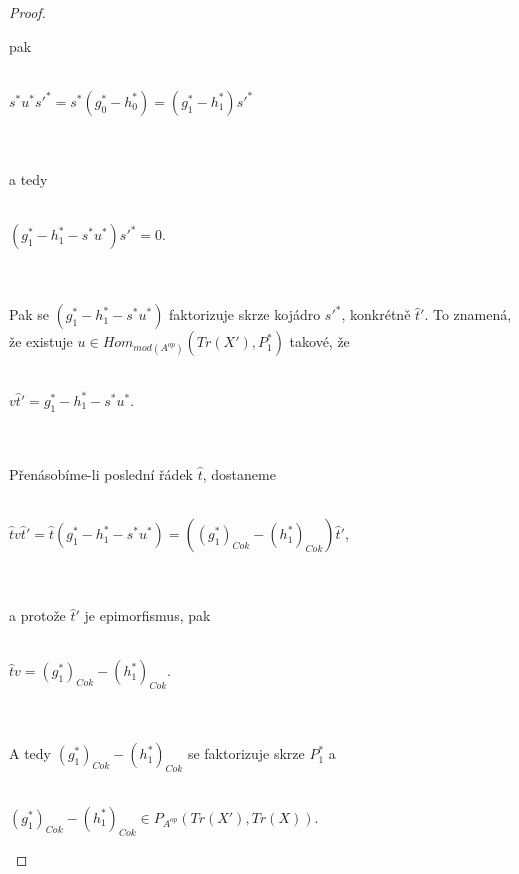 \begin{proof}
\begin{description}
         pak 
         \\\\\centerline{$s^*u^*s'^*=s^*(g_0^*-h_0^*)=(g_1^*-h_1^*)s'^*$}\\\\
          a tedy
         \\\\\centerline{$(g_1^*-h_1^*-s^*u^*)s'^*=0$.}\\\\
         Pak se $(g_1^*-h_1^*-s^*u^*)$ faktorizuje skrze kojádro $s'^*$, 
         konkrétně $\hat t'$. To znamená, že existuje $u\in Hom_{mod(A^{op})}(Tr(X'),P_1^*)$ 
         takové, že 
         \\\\\centerline{$v \hat t'=g_1^*-h_1^*-s^*u^*$.}\\\\
         Přenásobíme-li poslední řádek $\hat t$, dostaneme
         \\\\\centerline{$\hat t v \hat t'=\hat t (g_1^*-h_1^*-s^*u^*)=((g_1^*)_{Cok} - (h_1^*)_{Cok})\hat t '$,}\\\\
         a protože $\hat t'$ je epimorfismus, pak 
         \\\\\centerline{$\hat t v=(g_1^*)_{Cok}-(h_1^*)_{Cok}$.}\\\\
         A tedy $(g_1^*)_{Cok}-(h_1^*)_{Cok}$ se faktorizuje skrze $P_1^*$ a 
         \\\\\centerline{$(g_1^*)_{Cok}-(h_1^*)_{Cok} \in P_{A^{op}}(Tr(X'),Tr(X))$.}
                  

\end{description}
\end{proof}
